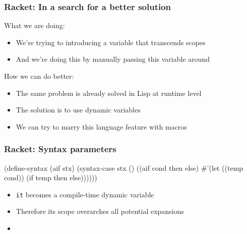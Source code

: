 \documentclass[svgnames,hyperref={bookmarks=false}]{beamer}
\begin{document}
\begin{frame}[fragile]
\frametitle{Racket: In a search for a better solution}
What we are doing:
\begin{itemize}
\item We're trying to introducing a variable that transcends scopes
\item And we're doing this by manually passing this variable around
\end{itemize}
\pause
\vskip50pt
How we can do better:
\begin{itemize}
\item The same problem is already solved in Lisp at runtime level
\item The solution is to use dynamic variables
\item We can try to marry this language feature with macros
\end{itemize}
\end{frame}

\begin{frame}[fragile]
\frametitle{Racket: Syntax parameters}
\begin{semiverbatim}

\text{\color{blue}{(define-syntax-parameter it (syntax-rules ()))}}

(define-syntax (aif stx)
  (syntax-case stx ()
    ((aif cond then else)
     #'(let ((temp cond))
             \text{\color{red}{(syntax-parameterize}}
               \text{\color{red}{((it (syntax-rules () ((_) temp))))}}
         (if temp then else))))))

\end{semiverbatim}

\begin{itemize}
\item \texttt{it} becomes a compile-time dynamic variable
\item Therefore its scope overarches all potential expansions
\item \text{\color{blue}{High-level language feature (dynamic variables) + macros = win}}
\end{itemize}
\end{frame}
\end{document}
